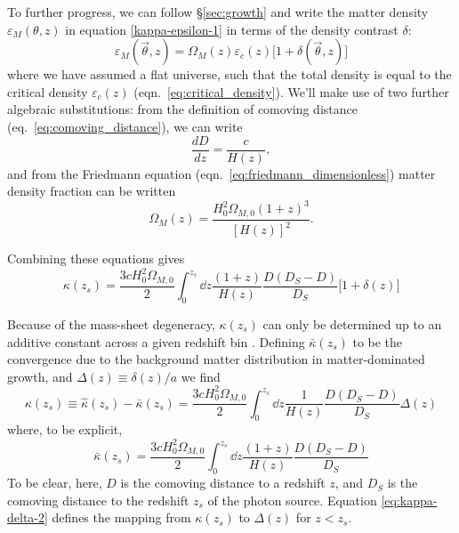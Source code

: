 To further progress, we can follow \S\ref{sec:growth} and write the
matter density $\varepsilon_M(\theta, z)$ in equation
\ref{kappa-epsilon-1} in terms of the density contrast $\delta$:
\begin{equation}
  \label{delta-def}
  \varepsilon_M(\vec{\theta},z) = \Omega_M(z) \varepsilon_c(z)\Big[1+\delta(\vec{\theta},z)\Big]
\end{equation}
where we have assumed a flat universe, such that the total density is
equal to the critical density $\varepsilon_c(z)$
(eqn.~\ref{eq:critical_density}).
We'll make use of two further algebraic substitutions:
from the definition of comoving distance (eq.~\ref{eq:comoving_distance}),
we can write
\begin{equation}
  \label{dDdz}
  \frac{dD}{dz} = \frac{c}{H(z)},
\end{equation}
and from the Friedmann equation (eqn.~\ref{eq:friedmann_dimensionless})
matter density fraction can be written
\begin{equation}
  \Omega_M(z) = \frac{H_0^2\Omega_{M,0}(1+z)^3}{[H(z)]^2}.
\end{equation}


Combining these equations gives
\begin{equation}
  \label{eq:kappa-delta}
  \kappa(z_s) = \frac{3cH_0^2\Omega_{M,0}}{2}\int_0^{z_s} \dd z \frac{(1+z)}{H(z)} \frac{D(D_S-D)}{D_S}\big[1+\delta(z)\big]
\end{equation}

Because of the mass-sheet degeneracy, $\kappa(z_s)$ can only be determined
up to an additive constant across a given redshift bin
\citep[see][for discussion]{seitz_schneider1996}.
Defining $\bar{\kappa}(z_s)$ to be the convergence due to the background
matter distribution in matter-dominated growth,
and $\Delta(z) \equiv \delta(z)/a$ we find
\begin{equation}
  \label{eq:kappa-delta-2}
  \kappa(z_s) \equiv \hat{\kappa}(z_s)-\bar\kappa(z_s) = 
  \frac{3cH_0^2\Omega_{M,0}}{2}\int_0^{z_s} \dd z 
  \frac{1}{H(z)} \frac{D(D_S-D)}{D_S}\Delta(z)
\end{equation}
where, to be explicit,
\begin{equation}
  \bar\kappa(z_s) = \frac{3cH_0^2\Omega_{M,0}}{2}\int_0^{z_s} \dd z 
  \frac{(1+z)}{H(z)} \frac{D(D_S-D)}{D_S}
\end{equation}
To be clear, here, $D$ is the comoving distance to a redshift $z$,
and $D_S$ is the comoving distance to the redshift $z_s$ of the photon
source.  Equation \ref{eq:kappa-delta-2} defines the mapping from $\kappa(z_s)$
to $\Delta(z)$ for $z<z_s$.

